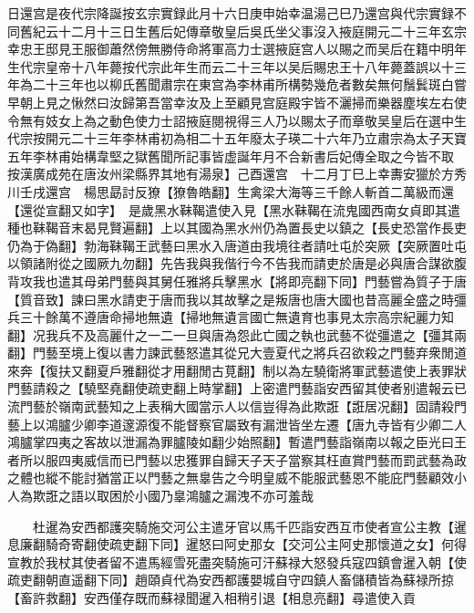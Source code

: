 日還宫是夜代宗降誕按玄宗實録此月十六日庚申始幸温湯己巳乃還宫與代宗實録不同舊紀云十二月十三日生舊后妃傳章敬皇后吳氏坐父事沒入掖庭開元二十三年玄宗幸忠王邸見王服御蕭然傍無勝侍命將軍高力士選掖庭宫人以賜之而吴后在籍中明年生代宗皇帝十八年薨按代宗此年生而云二十三年以吴后賜忠王十八年薨蓋誤以十三年為二十三年也以柳氏舊聞肅宗在東宫為李林甫所構勢幾危者數矣無何鬚鬂斑白嘗早朝上見之愀然曰汝歸第吾當幸汝及上至顧見宫庭殿宇皆不灑掃而樂器塵埃左右使令無有妓女上為之動色使力士詔掖庭閱視得三人乃以賜太子而章敬吴皇后在選中生代宗按開元二十三年李林甫初為相二十五年廢太子瑛二十六年乃立肅宗為太子天寶五年李林甫始構韋堅之獄舊聞所記事皆虚誕年月不合新書后妃傳全取之今皆不取　按漢廣成苑在唐汝州梁縣界其地有湯泉】己酉還宫　十二月丁巳上幸夀安獵於方秀川壬戌還宫　楊思勗討反獠【獠魯皓翻】生禽梁大海等三千餘人斬首二萬級而還【還從宣翻又如字】　是歲黑水靺鞨遣使入見【黑水靺鞨在流鬼國西南女貞即其遣種也靺鞨音末曷見賢遍翻】上以其國為黑水州仍為置長史以鎮之【長史恐當作長吏仍為于偽翻】勃海靺鞨王武藝曰黑水入唐道由我境往者請吐屯於突厥【突厥置吐屯以領諸附從之國厥九勿翻】先告我與我偕行今不告我而請吏於唐是必與唐合謀欲腹背攻我也遣其母弟門藝與其舅任雅將兵擊黑水【將即亮翻下同】門藝嘗為質子于唐【質音致】諫曰黑水請吏于唐而我以其故擊之是叛唐也唐大國也昔高麗全盛之時彊兵三十餘萬不遵唐命掃地無遺【掃地無遺言國亡無遺育也事見太宗高宗紀麗力知翻】况我兵不及高麗什之一二一旦與唐為怨此亡國之執也武藝不從彊遣之【彊其兩翻】門藝至境上復以書力諫武藝怒遣其從兄大壹夏代之將兵召欲殺之門藝弃衆閒道來奔【復扶又翻夏戶雅翻從才用翻閒古莧翻】制以為左驍衛將軍武藝遣使上表罪狀門藝請殺之【驍堅堯翻使疏吏翻上時掌翻】上密遣門藝詣安西留其使者别遣報云已流門藝於嶺南武藝知之上表稱大國當示人以信豈得為此欺誑【誑居况翻】固請殺門藝上以鴻臚少卿李道邃源復不能督察官屬致有漏泄皆坐左遷【唐九寺皆有少卿二人鴻臚掌四夷之客故以泄漏為罪臚陵如翻少始照翻】暫遣門藝詣嶺南以報之臣光曰王者所以服四夷威信而已門藝以忠獲罪自歸天子天子當察其枉直賞門藝而罰武藝為政之體也縱不能討猶當正以門藝之無辠告之今明皇威不能服武藝恩不能庇門藝顧效小人為欺誑之語以取困於小國乃辠鴻臚之漏洩不亦可羞哉

　　杜暹為安西都護突騎施交河公主遣牙官以馬千匹詣安西互市使者宣公主教【暹息廉翻騎奇寄翻使疏吏翻下同】暹怒曰阿史那女【交河公主阿史那懷道之女】何得宣教於我杖其使者留不遣馬經雪死盡突騎施可汗蘇禄大怒發兵寇四鎮會暹入朝【使疏吏翻朝直遥翻下同】趙頤貞代為安西都護嬰城自守四鎮人畜儲積皆為蘇禄所掠【畜許救翻】安西僅存既而蘇禄聞暹入相稍引退【相息亮翻】尋遣使入貢

